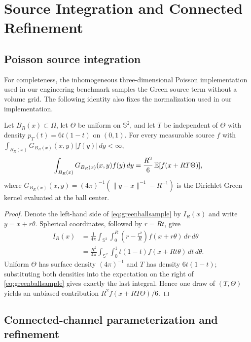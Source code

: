 \section{Source Integration and Connected Refinement}
\label{app:channelimplementation}

\subsection{Poisson source integration}

For completeness, the inhomogeneous three-dimensional Poisson implementation
used in our engineering benchmark samples the Green source term without a
volume grid.  The following identity also fixes the normalization used in our
implementation.

\begin{proposition}
\label{prop:greenballsample}
Let $B_R(x)\subset\Omega$, let $\Theta$ be uniform on $\mathbb S^2$, and let
$T$ be independent of $\Theta$ with density $p_T(t)=6t(1-t)$ on $(0,1)$.
For every measurable source $f$ with $\int_{B_R(x)}G_{B_R(x)}(x,y)|f(y)|\,dy<\infty$,
\begin{equation}
 \int_{B_R(x)}G_{B_R(x)}(x,y)f(y)\,dy
 =\frac{R^2}{6}\,\mathbb{E}[f(x+RT\Theta)],
 \label{eq:greenballsample}
\end{equation}
where $G_{B_R(x)}(x,y)=(4\pi)^{-1}
(\|y-x\|^{-1}-R^{-1})$ is the Dirichlet Green kernel evaluated at the ball
center.
\end{proposition}

\begin{proof}
Denote the left-hand side of \cref{eq:greenballsample} by $I_R(x)$ and write
$y=x+r\theta$.  Spherical coordinates, followed by $r=Rt$, give
\begin{align*}
 I_R(x)
 &=\frac1{4\pi}\int_{\mathbb S^2}\int_0^R
   \left(r-\frac{r^2}{R}\right)f(x+r\theta)\,dr\,d\theta\\
 &=\frac{R^2}{4\pi}\int_{\mathbb S^2}\int_0^1
   t(1-t)f(x+Rt\theta)\,dt\,d\theta.
\end{align*}
Uniform $\Theta$ has surface density $(4\pi)^{-1}$ and $T$ has density
$6t(1-t)$; substituting both densities into the expectation on the right of
\cref{eq:greenballsample} gives exactly the last integral.  Hence one draw of
$(T,\Theta)$ yields an unbiased contribution $R^2f(x+RT\Theta)/6$.
\end{proof}

\subsection{Connected-channel parameterization and refinement}

